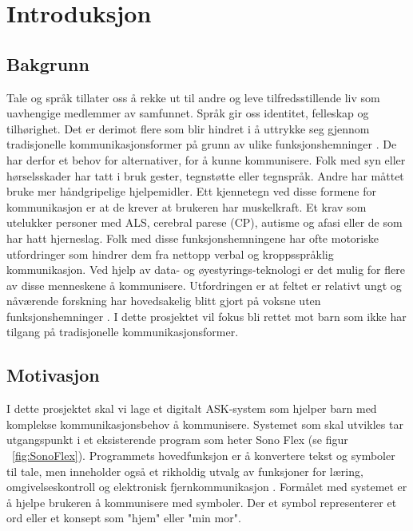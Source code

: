 
\chapter{Introduksjon}




\section{Bakgrunn}
\label{sec:motivasjon}

Tale og språk tillater oss å rekke ut til andre og leve tilfredsstillende liv som uavhengige medlemmer av samfunnet. Språk gir oss identitet, felleskap og tilhørighet. Det er derimot flere som blir hindret i å uttrykke seg gjennom tradisjonelle kommunikasjonsformer på grunn av ulike funksjonshemninger  \cite{tobii}. De har derfor et behov for alternativer, for å kunne kommunisere. Folk med syn eller hørselsskader har tatt i bruk gester, tegnstøtte eller tegnspråk. Andre har måttet bruke mer håndgripelige hjelpemidler. Ett kjennetegn ved disse formene for kommunikasjon er at de krever at brukeren har muskelkraft. Et krav som utelukker  personer med ALS, cerebral parese (CP), autisme og afasi eller de som har hatt hjerneslag. Folk med disse funksjonshemningene har ofte motoriske utfordringer som hindrer dem fra nettopp verbal og kroppsspråklig kommunikasjon. Ved hjelp av data- og øyestyrings-teknologi er det mulig for flere av disse menneskene å kommunisere. Utfordringen er at feltet er relativt ungt og nåværende forskning har hovedsakelig blitt gjort på voksne uten funksjonshemninger \cite{aac}. I dette prosjektet vil fokus bli rettet mot barn som ikke har tilgang på tradisjonelle kommunikasjonsformer. 


\section{Motivasjon}
\label{sec:goal}

I dette prosjektet skal vi lage et digitalt ASK-system som hjelper barn med komplekse kommunikasjonsbehov å kommunisere. Systemet som skal utvikles tar utgangspunkt i et eksisterende program som heter Sono Flex (se figur ~\ref{fig:SonoFlex}). Programmets hovedfunksjon er å konvertere tekst og symboler til tale, men inneholder også et rikholdig utvalg av funksjoner for læring, omgivelseskontroll og elektronisk fjernkommunikasjon \cite{TobiiCommunicator}. Formålet med systemet er å hjelpe brukeren å kommunisere med symboler. Der et symbol representerer et ord eller et konsept som "hjem" eller "min mor". 

